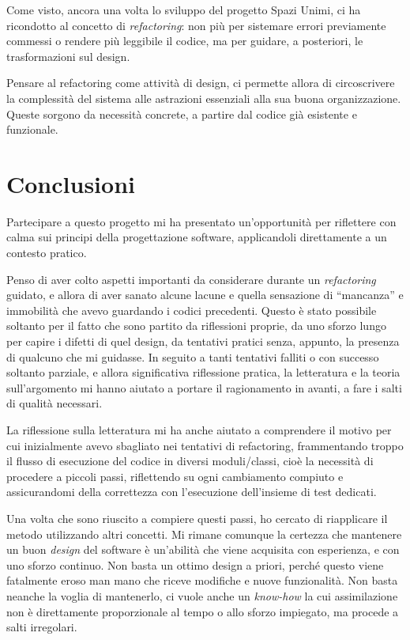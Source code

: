 \documentclass[12pt]{report}
\begin{document}
Come visto, ancora una volta lo sviluppo del progetto Spazi Unimi,
ci ha ricondotto al concetto di \textit{refactoring}: non più per sistemare
errori previamente commessi o rendere più leggibile il codice, 
ma per guidare, a posteriori, le trasformazioni sul design. 

Pensare al refactoring come attività di design, 
ci permette allora di circoscrivere la complessità del sistema alle 
astrazioni essenziali alla sua buona organizzazione. Queste sorgono 
da necessità concrete, a partire dal codice già esistente e funzionale.


\chapter{Conclusioni}

Partecipare a questo progetto mi ha presentato un'opportunità per
riflettere con calma sui principi della progettazione software, applicandoli
direttamente a un contesto pratico. 

Penso di aver colto aspetti importanti da considerare durante un 
\textit{refactoring} guidato, e allora di aver sanato alcune lacune e 
quella sensazione di ``mancanza'' e immobilità che avevo guardando i codici 
precedenti. Questo è stato possibile soltanto per il fatto che sono 
partito da riflessioni proprie, da uno sforzo lungo per capire i 
difetti di quel design, da tentativi pratici senza, appunto, 
la presenza di qualcuno che mi guidasse. In seguito a tanti tentativi
falliti o con successo soltanto parziale, e allora significativa riflessione
pratica, la letteratura e la teoria sull'argomento mi hanno aiutato a 
portare il ragionamento in avanti, a fare i salti di qualità
necessari.

La riflessione sulla letteratura mi ha anche aiutato a comprendere il 
motivo per cui inizialmente avevo sbagliato nei tentativi di refactoring,
frammentando troppo il flusso di esecuzione del codice 
in diversi moduli/classi, cioè la necessità
di procedere a piccoli passi, riflettendo su ogni
cambiamento compiuto e assicurandomi della correttezza con
l'esecuzione dell'insieme di test dedicati. 

Una volta che sono riuscito a compiere questi passi, ho cercato di riapplicare
il metodo utilizzando altri concetti. Mi rimane comunque la certezza che
mantenere un buon \textit{design} del software è un'abilità che viene acquisita
con esperienza, e con uno sforzo continuo. Non basta un ottimo design a
priori, perché questo viene fatalmente eroso man mano che riceve modifiche
e nuove funzionalità. Non basta neanche la voglia di mantenerlo, ci vuole
anche un \textit{know-how} la cui assimilazione non è direttamente 
proporzionale al tempo o allo sforzo impiegato, ma procede a salti irregolari.
\end{document}
